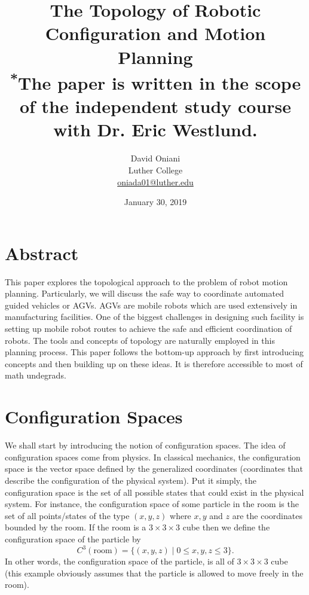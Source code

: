 \documentclass[a4paper, twocolumn]{article}
\title{The Topology of Robotic Configuration and Motion Planning\\
{\small \textsuperscript{*}The paper is written in the scope of the independent study course with Dr. Eric Westlund.}}
\author{David Oniani\\Luther College\\\href{mailto:oniada01@luther.edu}{oniada01@luther.edu}}
\date{January 30, 2019}
\theoremstyle{definition}
\begin{document}
\maketitle


\section*{\centering Abstract}
This paper explores the topological approach to the problem
of robot motion planning. Particularly, we will discuss
the safe way to coordinate automated guided vehicles or AGVs.
AGVs are mobile robots which are used extensively in manufacturing
facilities. One of the biggest challenges in designing such facility
is setting up mobile robot routes to achieve the safe and efficient
coordination of robots. The tools and concepts of topology
are naturally employed in this planning process. This paper follows
the bottom-up approach by first introducing concepts and then building
up on these ideas. It is therefore accessible to most of math undegrads.


\section*{\centering Configuration Spaces}
We shall start by introducing the notion of configuration spaces.
The idea of configuration spaces come from physics. In classical mechanics,
the configuration space is the vector space defined by the generalized
coordinates (coordinates that describe the configuration of the physical system).
Put it simply, the configuration space is the set of all possible states that
could exist in the physical system. For instance, the configuration space of some
particle in the room is the set of all points/states of the type $(x, y, z)$ where
$x, y$ and $z$ are the coordinates bounded by the room. If the room is a $3 \times 3 \times 3$
cube then we define the configuration space of the particle by
$$C^3(\text{room}) = \{(x, y, z) \mid 0 \leq x, y, z \leq 3\}.$$
In other words, the configuration space of the particle, is all of $3 \times 3 \times 3$ cube
(this example obviously assumes that the particle is allowed to move freely in the room).

\medskip
\end{document}
